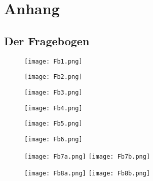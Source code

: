 \chapter*{Anhang} 
\label{cha:Anhang}
\section*{Der Fragebogen}
\label{Anh:Fragebogen}
\begin{figure}
\centering
\texttt{[image: Fb1.png]}
\end{figure}
\begin{figure}
\centering
\texttt{[image: Fb2.png]}
\end{figure}
\begin{figure}
\centering
\texttt{[image: Fb3.png]}
\end{figure}
\newpage
\begin{figure}
\centering
\texttt{[image: Fb4.png]}
\end{figure}
\begin{figure}
\centering
\texttt{[image: Fb5.png]}
\end{figure}
\newpage
\begin{figure}
\centering
\texttt{[image: Fb6.png]}
\end{figure}
\begin{figure}
\centering
\texttt{[image: Fb7a.png]}
\texttt{[image: Fb7b.png]}
\end{figure}
\begin{figure}
\centering
\texttt{[image: Fb8a.png]}
\texttt{[image: Fb8b.png]}
\end{figure}
